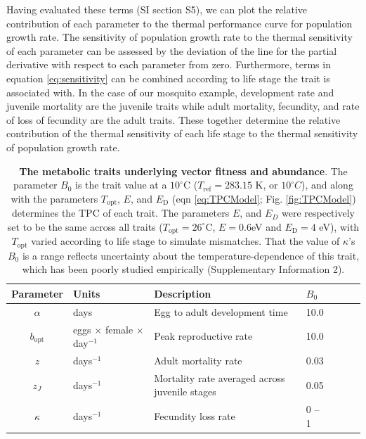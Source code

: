 Having evaluated these terms (SI section S5), we can plot the relative contribution of each parameter to the thermal performance curve for population growth rate. The sensitivity of population growth rate to the thermal sensitivity of each parameter can be assessed by the deviation of the line for the partial derivative with respect to each parameter from zero. Furthermore, terms in equation \eqref{eq:sensitivity} can be combined according to life stage the trait is associated with. In the case of our mosquito example, development rate and juvenile mortality are the juvenile traits while adult mortality, fecundity, and rate of loss of fecundity are the adult traits. These together  determine the relative contribution of the thermal sensitivity of each life stage to the thermal sensitivity of population growth rate. 

\begin{table}[ht]
\caption{{\bf The metabolic traits underlying vector fitness and abundance}. The parameter $B_0$ is the trait value at a $10^{\circ}$C ($T_\text{ref} = 283.15$ K, or $10^\circ C$), and along with the parameters $T_\text{opt}$, $E$, and $E_\text{D}$ (eqn \eqref{eq:TPCModel}; Fig. \ref{fig:TPCModel}) determines the TPC of each trait. The parameters $E$, and $E_D$ were respectively set to be the same across all traits ($T_\text{opt} = 26^\circ$C, $E = 0.6$eV and $E_\text{D} = 4$ eV), with $T_\text{opt}$ varied according to life stage to simulate mismatches. That the value of $\kappa$'s $B_0$ is a range reflects uncertainty about the temperature-dependence of this trait, which has been poorly studied empirically (Supplementary Information 2).}
\label{tab:traits}
\centering
\begin{tabular}{c p{4cm} p{8cm} l l l l } \toprule
{\bf Parameter} & {\bf Units} & {\bf Description} & $B_0$ \\ \midrule
 $\alpha$ & days & Egg to adult development time & 10.0 \\
$b_\text{opt}$ & eggs $\times$ female $\times$ day$^{-1}$ & Peak 
reproductive rate & 10.0 \\
$z$ & days$^{-1}$ & Adult mortality rate & 0.03\\
$z_J$ & days$^{-1}$ & Mortality rate averaged across juvenile stages & 
0.05 \\
$\kappa$ & days$^{-1}$ & Fecundity loss rate & 0 -- 1 \\ \bottomrule
\end{tabular}

\end{table}

